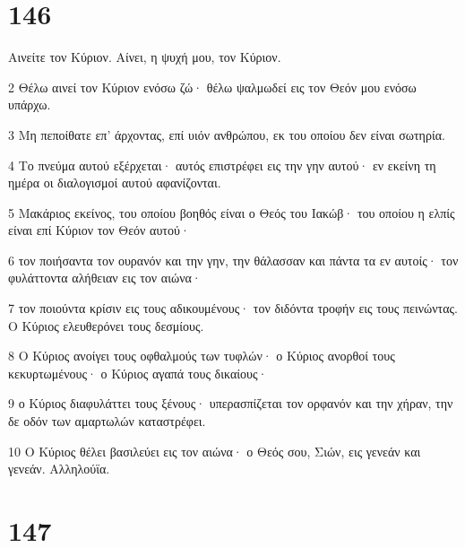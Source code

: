 \chapter{146}

\par Αινείτε τον Κύριον. Αίνει, η ψυχή μου, τον Κύριον.
\par 2 Θέλω αινεί τον Κύριον ενόσω ζώ· θέλω ψαλμωδεί εις τον Θεόν μου ενόσω υπάρχω.
\par 3 Μη πεποίθατε επ' άρχοντας, επί υιόν ανθρώπου, εκ του οποίου δεν είναι σωτηρία.
\par 4 Το πνεύμα αυτού εξέρχεται· αυτός επιστρέφει εις την γην αυτού· εν εκείνη τη ημέρα οι διαλογισμοί αυτού αφανίζονται.
\par 5 Μακάριος εκείνος, του οποίου βοηθός είναι ο Θεός του Ιακώβ· του οποίου η ελπίς είναι επί Κύριον τον Θεόν αυτού·
\par 6 τον ποιήσαντα τον ουρανόν και την γην, την θάλασσαν και πάντα τα εν αυτοίς· τον φυλάττοντα αλήθειαν εις τον αιώνα·
\par 7 τον ποιούντα κρίσιν εις τους αδικουμένους· τον διδόντα τροφήν εις τους πεινώντας. Ο Κύριος ελευθερόνει τους δεσμίους.
\par 8 Ο Κύριος ανοίγει τους οφθαλμούς των τυφλών· ο Κύριος ανορθοί τους κεκυρτωμένους· ο Κύριος αγαπά τους δικαίους·
\par 9 ο Κύριος διαφυλάττει τους ξένους· υπερασπίζεται τον ορφανόν και την χήραν, την δε οδόν των αμαρτωλών καταστρέφει.
\par 10 Ο Κύριος θέλει βασιλεύει εις τον αιώνα· ο Θεός σου, Σιών, εις γενεάν και γενεάν. Αλληλούϊα.

\chapter{147}

